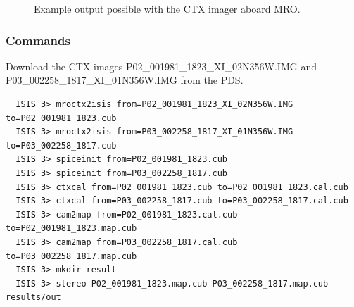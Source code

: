\begin{figure}[h!]
\centering
  \hfil
\caption{Example output possible with the CTX imager aboard MRO.}
\label{fig:ctx_example}
\end{figure}

\subsubsection*{Commands}

Download the \ac{CTX} images P02\_001981\_1823\_XI\_02N356W.IMG and
P03\_002258\_1817\_XI\_01N356W.IMG from the \ac{PDS}.
\begin{verbatim}
  ISIS 3> mroctx2isis from=P02_001981_1823_XI_02N356W.IMG to=P02_001981_1823.cub
  ISIS 3> mroctx2isis from=P03_002258_1817_XI_01N356W.IMG to=P03_002258_1817.cub
  ISIS 3> spiceinit from=P02_001981_1823.cub
  ISIS 3> spiceinit from=P03_002258_1817.cub
  ISIS 3> ctxcal from=P02_001981_1823.cub to=P02_001981_1823.cal.cub
  ISIS 3> ctxcal from=P03_002258_1817.cub to=P03_002258_1817.cal.cub
  ISIS 3> cam2map from=P02_001981_1823.cal.cub to=P02_001981_1823.map.cub
  ISIS 3> cam2map from=P03_002258_1817.cal.cub to=P03_002258_1817.map.cub
  ISIS 3> mkdir result
  ISIS 3> stereo P02_001981_1823.map.cub P03_002258_1817.map.cub results/out
\end{verbatim}

